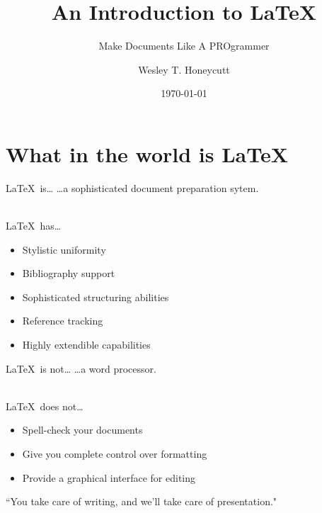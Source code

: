 \documentclass{beamer}
\title{An Introduction to \LaTeX}
\subtitle{Make Documents Like A PROgrammer}
\author{Wesley T. Honeycutt}
\institute{University of Oklahoma}
\date{\today}
\begin{document}
	\frame{\titlepage}
	
	\section{What in the world is \LaTeX}
	
	
		\begin{frame}{\LaTeX~is\ldots}
			\ldots a sophisticated document preparation sytem.
			\\~\\
			\begin{block}{\LaTeX~has\ldots}
				\begin{itemize}
					\item Stylistic uniformity
					\item Bibliography support
					\item Sophisticated structuring abilities
					\item Reference tracking
					\item Highly extendible capabilities
				\end{itemize}
			\end{block}
		\end{frame}
		
		\begin{frame}{\LaTeX~is not\ldots}
			\ldots a word processor.
			\\~\\
			\begin{block}{\LaTeX~does not\ldots}
			\begin{itemize}
				\item Spell-check your documents
				\item Give you complete control over formatting
				\item Provide a graphical interface for editing
			\end{itemize}
			\end{block}
			``You take care of writing, and we'll take care of presentation."
		\end{frame}
	
\end{document}
